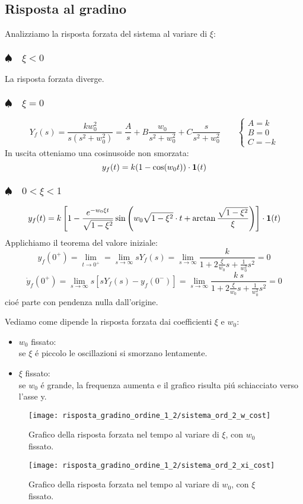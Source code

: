 \documentclass[../main.tex]{subfiles}
\begin{document}
	\subsection{Risposta al gradino}
		Analizziamo la risposta forzata del sistema al variare di $ \xi $:
	
	\subsubsection{$ \spadesuit \quad \xi < 0 $}
		La risposta forzata diverge.
		
	\subsubsection{$ \spadesuit \quad \xi = 0 $}
		\[
			Y_f(s) = \frac{kw_0^2}{s(s^2+w_0^2)} = \frac{A}{s} + B\frac{w_0}{s^2+w_0^2} + C\frac{s}{s^2+w_0^2}
			\qquad
			\begin{cases}
				A = k\\
				B = 0\\
				C = -k
			\end{cases}
		\]
		In uscita otteniamo una cosinusoide non smorzata:
		\[
			y_f(t) = k(1-\cos(w_0t)) \cdot \textbf{1}(t)
		\]
		
	\subsubsection{$ \spadesuit \quad 0 < \xi < 1 $}
		\[ 
			y_f(t) = k \left[ 1 - \frac{e^{-w_0\xi t}}{\sqrt{1-\xi^2}} \sin\left( w_0 \sqrt{1-\xi^2} \cdot t + \arctan \frac{\sqrt{1-\xi^2}}{\xi} \right) \right] \cdot \textbf{1}(t) 
		\]
		Applichiamo il teorema del valore iniziale:
		\[ 
			y_f(0^+) = \lim_{t \to 0^+} = \lim_{s \to \infty} s Y_f(s) = \lim_{s \to \infty} \frac{k}{1 + 2\frac{\xi}{w_0}s + \frac{1}{w_0^2}s^2} = 0
		\]
		\[ 
			\dot y_f(0^+) = \lim_{s \to \infty} s \left[ sY_f(s) - y_f(0^-) \right] = \lim_{s \to \infty} \frac{k\ s}{1 + 2\frac{\xi}{w_0}s + \frac{1}{w_0^2}s^2} = 0
		\]
		cio\'e parte con pendenza nulla dall'origine.
		
		Vediamo come dipende la risposta forzata dai coefficienti $ \xi $ e $ w_0 $:
		\begin{itemize}
			\item 
				$ w_0 $ fissato:\\
				se $ \xi $ \'e piccolo le oscillazioni si smorzano lentamente.
			\item 
				$ \xi $ fissato:\\
				se $ w_0 $ \'e grande, la frequenza aumenta e il grafico risulta pi\'u schiacciato verso l'asse y.
		\end{itemize}
		\begin{figure}[H]
			\centering
			\texttt{[image: risposta\_gradino\_ordine\_1\_2/sistema\_ord\_2\_w\_cost]}
			\caption{Grafico della risposta forzata nel tempo al variare di $ \xi $, con $ w_0 $ fissato.}
		\end{figure} 
		\begin{figure}[H]
			\centering
			\texttt{[image: risposta\_gradino\_ordine\_1\_2/sistema\_ord\_2\_xi\_cost]}
			\caption{Grafico della risposta forzata nel tempo al variare di $ w_0 $, con $ \xi $ fissato.}
		\end{figure}
		
\end{document}
